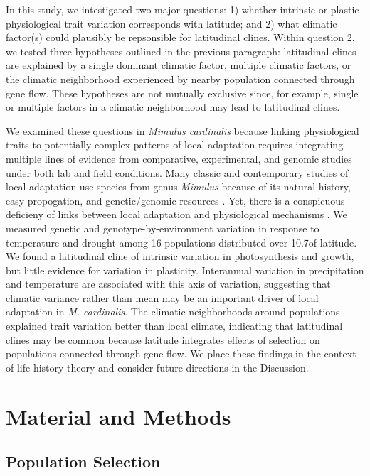 \documentclass[11pt, oneside]{article}
\begin{document}
In this study, we intestigated two major questions: 1) whether intrinsic or plastic physiological trait variation corresponds with latitude; and 2) what climatic factor(s) could plausibly be repsonsible for latitudinal clines. Within question 2, we tested three hypotheses outlined in the previous paragraph: latitudinal clines are explained by a single dominant climatic factor, multiple climatic factors, or the climatic neighborhood experienced by nearby population connected through gene flow. These hypotheses are not mutually exclusive since, for example, single or multiple factors in a climatic neighborhood may lead to latitudinal clines.

We examined these questions in \textit{Mimulus cardinalis} because linking physiological traits to potentially complex patterns of local adaptation requires integrating multiple lines of evidence from comparative, experimental, and genomic studies under both lab and field conditions. Many classic and contemporary studies of local adaptation use species from genus \textit{Mimulus} because of its natural history, easy propogation, and genetic/genomic resources \citep{Clausen_etal_1940, Hiesey_etal_1971, Bradshaw_Schemske_2003, Wu_etal_2008, Lowry_Willis_2010, Wright_etal_2013}. Yet, there is a conspicuous deficieny of links between local adaptation and physiological mechanisms \citep{Angert_2006, Angert_etal_2008, Wu_etal_2010}. We measured genetic and genotype-by-environment variation in response to temperature and drought among 16 populations distributed over 10.7\textdegree of latitude. We found a latitudinal cline of intrinsic variation in photosynthesis and growth, but little evidence for variation in plasticity. Interannual variation in precipitation and temperature are associated with this axis of variation, suggesting that climatic variance rather than mean may be an important driver of local adaptation in \textit{M. cardinalis}. The climatic neighborhoods around populations explained trait variation better than local climate, indicating that latitudinal clines may be common because latitude integrates effects of selection on populations connected through gene flow. We place these findings in the context of life history theory and consider future directions in the Discussion. 

\section*{Material and Methods}

\subsection*{Population Selection}
\end{document}
